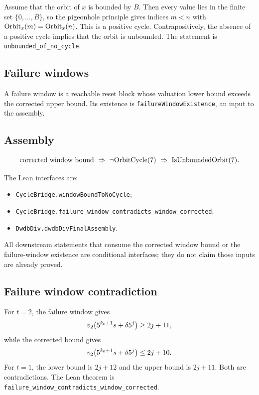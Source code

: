 Assume that the orbit of $x$ is bounded by $B$.  Then every value lies
in the finite set $\{0,\dots,B\}$, so the pigeonhole principle gives
indices $m<n$ with $\mathrm{Orbit}_x(m)=\mathrm{Orbit}_x(n)$.  This is a positive
cycle.  Contrapositively, the absence of a positive cycle implies that
the orbit is unbounded.  The statement is
\texttt{unbounded\_of\_no\_cycle}.

\subsection{Failure windows}

A failure window is a reachable reset block whose valuation lower bound
exceeds the corrected upper bound.  Its existence is
\texttt{failureWindowExistence}, an input to the assembly.

\subsection{Assembly}

\begin{equation*}
  \text{corrected window bound}\ \Rightarrow\ \neg\OrbitCycle(7)
  \ \Rightarrow\ \mathrm{IsUnboundedOrbit}(7).
\end{equation*}

The Lean interfaces are:
\begin{itemize}[leftmargin=*]
\item \texttt{CycleBridge.windowBoundToNoCycle};
\item \texttt{CycleBridge.failure\_window\_contradicts\_window\_corrected};
\item \texttt{DwdbDiv.dwdbDivFinalAssembly}.
\end{itemize}

All downstream statements that consume the corrected window bound or
the failure-window existence are conditional interfaces; they do not
claim those inputs are already proved.

\subsection{Failure window contradiction}

For $t=2$, the failure window gives
\begin{equation*}
  v_2\!\left(5^{k_0+1}s+\delta5^j\right)\ge2j+11,
\end{equation*}
while the corrected bound gives
\begin{equation*}
  v_2\!\left(5^{k_0+1}s+\delta5^j\right)\le2j+10.
\end{equation*}
For $t=1$, the lower bound is $2j+12$ and the upper bound is $2j+11$.
Both are contradictions.  The Lean theorem is
\texttt{failure\_window\_contradicts\_window\_corrected}.


